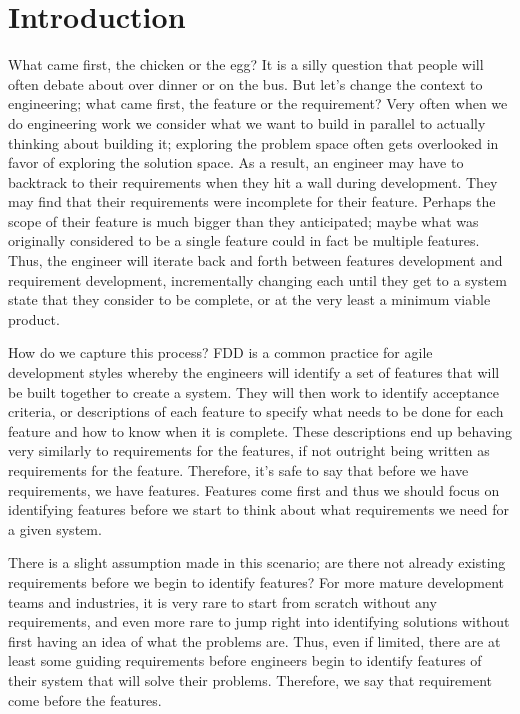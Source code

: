 \chapter{Introduction}

What came first, the chicken or the egg? It is a silly question that people will often debate about over dinner or on the bus. But let's change the context to engineering; what came first, the feature or the requirement? Very often when we do engineering work we consider what we want to build in parallel to actually thinking about building it; exploring the problem space often gets overlooked in favor of exploring the solution space. As a result, an engineer may have to backtrack to their requirements when they hit a wall during development. They may find that their requirements were incomplete for their feature. Perhaps the scope of their feature is much bigger than they anticipated; maybe what was originally considered to be a single feature could in fact be multiple features. Thus, the engineer will iterate back and forth between features development and requirement development, incrementally changing each until they get to a system state that they consider to be complete, or at the very least a minimum viable product. 

How do we capture this process? \ac{FDD} is a common practice for agile development styles whereby the engineers will identify a set of features that will be built together to create a system. They will then work to identify acceptance criteria, or descriptions of each feature to specify what needs to be done for each feature and how to know when it is complete. These descriptions end up behaving very similarly to requirements for the features, if not outright being written as requirements for the feature. Therefore, it's safe to say that before we have requirements, we have features. Features come first and thus we should focus on identifying features before we start to think about what requirements we need for a given system.

There is a slight assumption made in this scenario; are there not already existing requirements before we begin to identify features? For more mature development teams and industries, it is very rare to start from scratch without any requirements, and even more rare to jump right into identifying solutions without first having an idea of what the problems are. Thus, even if limited, there are at least some guiding requirements before engineers begin to identify features of their system that will solve their problems. Therefore, we say that requirement come before the features. 

